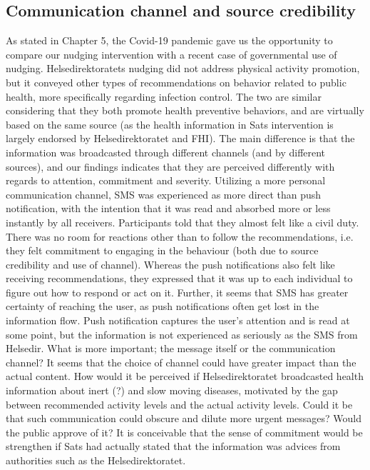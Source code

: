 \subsection{Communication channel and source credibility}
As stated in Chapter 5, the Covid-19 pandemic gave us the opportunity to compare our nudging intervention with a recent case of governmental use of nudging. Helsedirektoratets nudging did not address physical activity promotion, but it conveyed other types of recommendations on behavior related to public health, more specifically regarding infection control. The two are similar considering that they both promote health preventive behaviors, and are virtually based on the same source (as the health information in Sats intervention is largely endorsed by Helsedirektoratet and FHI). The main difference is that the information was broadcasted through different channels (and by different sources), and our findings indicates that they are perceived differently with regards to attention, commitment and severity. Utilizing a more personal communication channel, SMS was experienced as more direct than push notification, with the intention that it was read and absorbed more or less instantly by all receivers. Participants told that they almost felt like a civil duty. There was no room for reactions other than to follow the recommendations, i.e. they felt commitment to engaging in the behaviour (both due to source credibility and use of channel). Whereas the push notifications also felt like receiving recommendations, they expressed that it was up to each individual to figure out how to respond or act on it. Further, it seems that SMS has greater certainty of reaching the user, as push notifications often get lost in the information flow. Push notification captures the user's attention and is read at some point, but the information is not experienced as seriously as the SMS from Helsedir. What is more important; the message itself or the communication channel? It seems that the choice of channel could have greater impact than the actual content. How would it be perceived if Helsedirektoratet broadcasted health information about inert (?) and slow moving diseases, motivated by the gap between recommended activity levels and the actual activity levels. Could it be that such communication could obscure and dilute more urgent messages? Would the public approve of it? It is conceivable that the sense of commitment would be strengthen if Sats had actually stated that the information was advices from authorities such as the Helsedirektoratet. 

